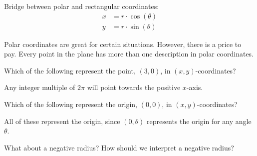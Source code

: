 \documentclass{ximera}
\begin{document}
Bridge between polar and rectangular coordinates:
\begin{align*}
    x &= r\cdot \cos(\theta)\\
    y &= r\cdot \sin(\theta)
\end{align*}



















Polar coordinates are great for certain situations. However, there is
a price to pay. Every point in the plane has more than one
description in polar coordinates.





\begin{question}
  Which of the following represent the point, $(3,0)$, in
  $(x,y)$-coordinates?
  \begin{selectAll}
  \end{selectAll}
  \begin{feedback}
    Any integer multiple of $2\pi$ will point towards the positive $x$-axis.
  \end{feedback}
\end{question}





\begin{question}
  Which of the following represent the origin, $(0,0)$, in
  $(x,y)$-coordinates?
  \begin{selectAll}
  \end{selectAll}
  \begin{feedback}
    All of these represent the origin, since $(0,\theta)$ represents
    the origin for any angle $\theta$.
  \end{feedback}
\end{question}



What about a negative radius? How should we interpret a negative radius? 
\end{document}
